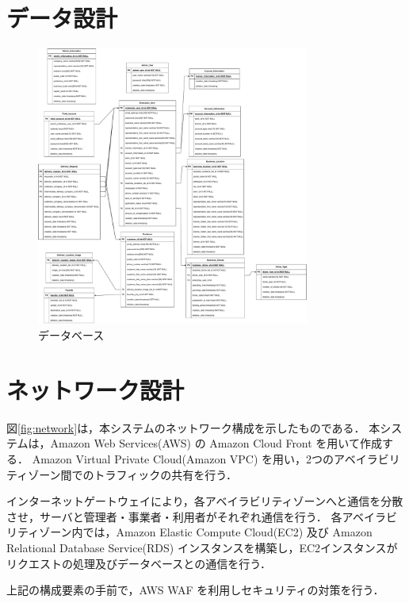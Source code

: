 \documentclass[a4paper, titlepage]{jsarticle}
\begin{document}
\section{データ設計}
\begin{figure}[H]
  \centering
  \includegraphics[width=0.8\textwidth]{other/database.pdf}
  \caption{データベース}
  \label{fig:driver}
\end{figure}
\section{ネットワーク設計}
図\ref{fig:network}は，本システムのネットワーク構成を示したものである．
本システムは，Amazon Web Services(AWS) の Amazon Cloud Front を用いて作成する．
Amazon Virtual Private Cloud(Amazon VPC) を用い，2つのアベイラビリティゾーン間でのトラフィックの共有を行う．

インターネットゲートウェイにより，各アベイラビリティゾーンへと通信を分散させ，サーバと管理者・事業者・利用者がそれぞれ通信を行う．
各アベイラビリティゾーン内では，Amazon Elastic Compute Cloud(EC2) 及び Amazon Relational Database Service(RDS) インスタンスを構築し，EC2インスタンスがリクエストの処理及びデータベースとの通信を行う．

上記の構成要素の手前で，AWS WAF を利用しセキュリティの対策を行う．
\end{document}
